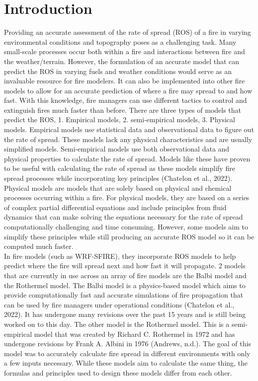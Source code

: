 \documentclass{article}
\begin{document}
\section{Introduction}
Providing an accurate assessment of the rate of spread (ROS) of a fire in varying environmental conditions and topography poses as a challenging task. Many small-scale processes occur both within a fire and interactions between fire and the weather/terrain. However, the formulation of an accurate model that can predict the ROS in varying fuels and weather conditions would serve as an invaluable resource for fire modelers. It can also be implemented into other fire models to allow for an accurate prediction of where a fire may spread to and how fast. With this knowledge, fire managers can use different tactics to control and extinguish fires much faster than before. There are three types of models that predict the ROS, 1. Empirical models, 2. semi-empirical models, 3. Physical models. Empirical models use statistical data and observational data to figure out the rate of spread. These models lack any physical characteristics and are usually simplified models. Semi-empirical models use both observational data and physical properties to calculate the rate of spread. Models like these have proven to be useful with calculating the rate of spread as these models simplify fire spread processes while incorporating key principles (Chatelon et al., 2022). Physical models are models that are solely based on physical and chemical processes occurring within a fire. For physical models, they are based on a series of complex partial differential equations and include principles from fluid dynamics that can make solving the equations necessary for the rate of spread computationally challenging and time consuming. However, some models aim to simplify these principles while still producing an accurate ROS model so it can be computed much faster. \\
\indent In fire models (such as WRF-SFIRE), they incorporate ROS models to help predict where the fire will spread next and how fast it will propagate. 2 models that are currently in use across an array of fire models are the Balbi model and the Rothermel model. The Balbi model is a physics-based model which aims to provide computationally fast and accurate simulations of fire propagation that can be used by fire managers under operational conditions (Chatelon et al., 2022). It has undergone many revisions over the past 15 years and is still being worked on to this day. The other model is the Rothermel model. This is a semi-empirical model that was created by Richard C. Rothermel in 1972 and has undergone revisions by Frank A. Albini in 1976 (Andrews, n.d.). The goal of this model was to accurately calculate fire spread in different environments with only a few inputs necessary. While these models aim to calculate the same thing, the formulas and principles used to design these models differ from each other. \\
\end{document}
